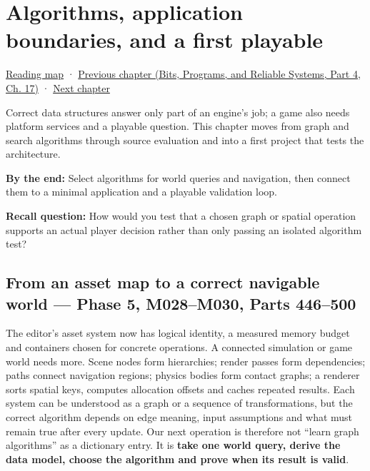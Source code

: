 \chapter{Algorithms, application boundaries, and a first playable}\label{05-engine-i-ch008-algorithms-application-boundaries-and-a-first-playable}\hypertarget{05-engine-i-ch008}{}\label{stagechapter:05-engine-i-ch008}

\hypertarget{05-engine-i-ch008-algorithms-application-boundaries-and-a-first-playable}{}

\hyperref[volume-reading-map]{Reading map} · \href{../01-Bits-Programs-and-Reliable-Systems-P04/main.pdf\#nameddest=05-engine-i-ch007-typed-apis-and-measured-cpu-data-structures}{Previous chapter (Bits, Programs, and Reliable Systems, Part 4, Ch. 17)} · \hyperref[05-engine-i-ch009-player-choices-rules-and-readable-feedback]{Next chapter}

Correct data structures answer only part of an engine's job; a game also needs platform services and a playable question. This chapter moves from graph and search algorithms through source evaluation and into a first project that tests the architecture.

\textbf{By the end:} Select algorithms for world queries and navigation, then connect them to a minimal application and a playable validation loop.

\textbf{Recall question:} How would you test that a chosen graph or spatial operation supports an actual player decision rather than only passing an isolated algorithm test?

\section{From an asset map to a correct navigable world --- Phase 5, M028--M030, Parts 446--500}\label{05-engine-i-ch008-from-an-asset-map-to-a-correct-navigable-world-phase-5-m028m030-parts-446500}

\hypertarget{05-engine-i-ch008-from-an-asset-map-to-a-correct-navigable-world-phase-5-m028m030-parts-446500}{}

The editor's asset system now has logical identity, a measured memory budget and containers chosen for concrete operations. A connected simulation or game world needs more. Scene nodes form hierarchies; render passes form dependencies; paths connect navigation regions; physics bodies form contact graphs; a renderer sorts spatial keys, computes allocation offsets and caches repeated results. Each system can be understood as a graph or a sequence of transformations, but the correct algorithm depends on edge meaning, input assumptions and what must remain true after every update. Our next operation is therefore not ``learn graph algorithms'' as a dictionary entry. It is \textbf{take one world query, derive the data model, choose the algorithm and prove when its result is valid}.

